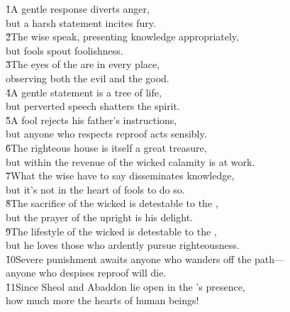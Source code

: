 \begin{poetry}
\poeml {}
\v{1}A gentle response diverts anger, \\
\poeml but a harsh statement incites fury. \\
\poeml \v{2}The wise speak, presenting knowledge appropriately, \\
\poemll    but fools spout foolishness. \\
\poeml \v{3}The eyes of the  are in every place, \\
\poemll    observing both the evil and the good. \\
\poeml \v{4}A gentle statement is a tree of life, \\
\poemll    but perverted speech shatters the spirit. \\
\poeml \v{5}A fool rejects his father's instructions, \\
\poemll    but anyone who respects reproof acts sensibly. \\
\poeml \v{6}The righteous house is itself a great treasure, \\
\poemll    but within the revenue of the wicked calamity is at work. \\
\poeml \v{7}What the wise have to say disseminates knowledge, \\
\poemll    but it's not in the heart of fools to do so. \\
\poeml \v{8}The sacrifice of the wicked is detestable to the , \\
\poemll    but the prayer of the upright is his delight. \\
\poeml \v{9}The lifestyle of the wicked is detestable to the , \\
\poemll    but he loves those who ardently pursue righteousness. \\
\poeml \v{10}Severe punishment awaits anyone who wanders off the path--- \\
\poemll    anyone who despises reproof will die. \\
\poeml \v{11}Since Sheol and Abaddon lie open in the 's presence, \\
\poemll    how much more the hearts of human beings! \\

\end{poetry}
